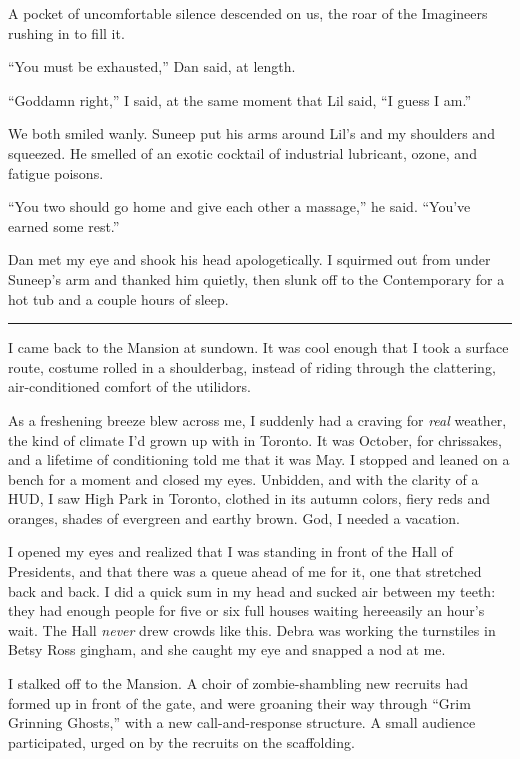 A pocket of uncomfortable silence descended on us, the roar of the
Imagineers rushing in to fill it.

“You must be exhausted,” Dan said, at length.

“Goddamn right,” I said, at the same moment that Lil said, “I guess
I am.”

We both smiled wanly. Suneep put his arms around Lil's and my
shoulders and squeezed. He smelled of an exotic cocktail of
industrial lubricant, ozone, and fatigue poisons.

“You two should go home and give each other a massage,” he said.
“You've earned some rest.”

Dan met my eye and shook his head apologetically. I squirmed out
from under Suneep's arm and thanked him quietly, then slunk off to
the Contemporary for a hot tub and a couple hours of sleep.

\begin{center}\rule{3in}{0.4pt}\end{center}

I came back to the Mansion at sundown. It was cool enough that I
took a surface route, costume rolled in a shoulderbag, instead of
riding through the clattering, air-conditioned comfort of the
utilidors.

As a freshening breeze blew across me, I suddenly had a craving for
\emph{real} weather, the kind of climate I'd grown up with in
Toronto. It was October, for chrissakes, and a lifetime of
conditioning told me that it was May. I stopped and leaned on a
bench for a moment and closed my eyes. Unbidden, and with the
clarity of a HUD, I saw High Park in Toronto, clothed in its autumn
colors, fiery reds and oranges, shades of evergreen and earthy
brown. God, I needed a vacation.

I opened my eyes and realized that I was standing in front of the
Hall of Presidents, and that there was a queue ahead of me for it,
one that stretched back and back. I did a quick sum in my head and
sucked air between my teeth: they had enough people for five or six
full houses waiting here{\dash}easily an hour's wait. The Hall
\emph{never} drew crowds like this. Debra was working the
turnstiles in Betsy Ross gingham, and she caught my eye and snapped
a nod at me.

I stalked off to the Mansion. A choir of zombie-shambling new
recruits had formed up in front of the gate, and were groaning
their way through “Grim Grinning Ghosts,” with a new
call-and-response structure. A small audience participated, urged
on by the recruits on the scaffolding.

